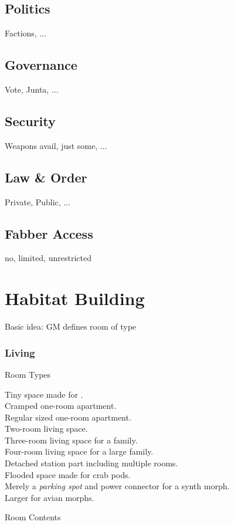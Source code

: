 \documentclass[a4]{article}
\begin{document}
\subsection{Politics} Factions, ...
\subsection{Governance} Vote, Junta, ...
\subsection{Security} Weapons avail, just some, ...
\subsection{Law \& Order} Private, Public, ...
\subsection{Fabber Access} no, limited, unrestricted


\section{Habitat Building}

Basic idea: GM defines room of type


\subsubsection{Living}

Room Types

\starttableone
Tiny space made for .\\
Cramped one-room apartment.\\
Regular sized one-room apartment.\\
Two-room living space.\\
Three-room living space for a family.\\
Four-room living space for a large family.\\
Detached station part including multiple rooms.\\
Flooded space made for crab pods.\\
Merely a \textit{parking spot} and power connector for a synth morph.\\
Larger  for avian morphs.\\
\stoptableone


Room Contents
\end{document}
